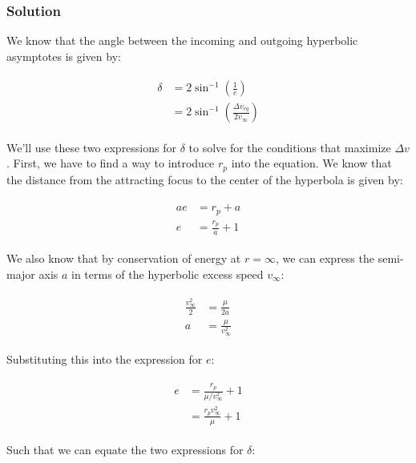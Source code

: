 \documentclass[
]{article}
\begin{document}
\subsubsection{Solution}\label{solution-2}

We know that the angle between the incoming and outgoing hyperbolic
asymptotes is given by:

\[\begin{aligned}
\begin{aligned}
    \delta &= 2 \sin^{-1} \left( \frac{1}{e} \right) \\
    &= 2 \sin^{-1} \left( \frac{\Delta v_{eq}}{2 v_\infty} \right)
\end{aligned}
\end{aligned}\]

We'll use these two expressions for \(\delta\) to solve for the
conditions that maximize \(\Delta v\). First, we have to find a way to
introduce \(r_p\) into the equation. We know that the distance from the
attracting focus to the center of the hyperbola is given by:

\[\begin{aligned}
\begin{aligned}
    ae &= r_p + a \\
    e &= \frac{r_p}{a} + 1
\end{aligned}
\end{aligned}\]

We also know that by conservation of energy at \(r=\infty\), we can
express the semi-major axis \(a\) in terms of the hyperbolic excess
speed \(v_\infty\):

\[\begin{aligned}
\begin{aligned}
    \frac{v_\infty^2}{2} &= \frac{\mu}{2a} \\
    a &= \frac{\mu}{v_\infty^2}
\end{aligned}
\end{aligned}\]

Substituting this into the expression for \(e\):

\[\begin{aligned}
\begin{aligned}
    e &= \frac{r_p}{\mu/v_\infty^2} + 1 \\
    &= \frac{r_p v_\infty^2}{\mu} + 1
\end{aligned}
\end{aligned}\]

Such that we can equate the two expressions for \(\delta\):
\end{document}
